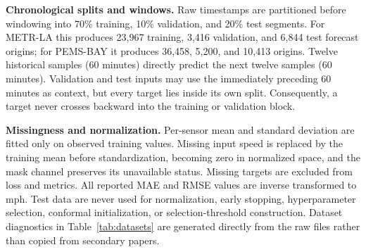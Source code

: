 \documentclass[preprint,12pt]{elsarticle}
\begin{document}
\textbf{Chronological splits and windows.} Raw timestamps are partitioned
before windowing into 70\% training, 10\% validation, and 20\% test segments.
For METR-LA this produces 23,967 training, 3,416 validation, and 6,844 test
forecast origins; for PEMS-BAY it produces 36,458, 5,200, and 10,413 origins.
Twelve historical samples (60 minutes) directly predict the next twelve
samples (60 minutes). Validation and test inputs may use the immediately
preceding 60 minutes as context, but every target lies inside its own split.
Consequently, a target never crosses backward into the training or validation
block.

\textbf{Missingness and normalization.} Per-sensor mean and standard deviation
are fitted only on observed training values. Missing input speed is replaced by
the training mean before standardization, becoming zero in normalized space,
and the mask channel preserves its unavailable status. Missing targets are
excluded from loss and metrics. All reported MAE and RMSE values are inverse
transformed to mph. Test data are never used for normalization, early stopping,
hyperparameter selection, conformal initialization, or selection-threshold
construction. Dataset diagnostics in Table~\ref{tab:datasets} are generated
directly from the raw files rather than copied from secondary papers.
\begin{table}[t]
  \centering
  \caption{Dataset diagnostics computed from checksum-verified raw files.
  Speed is in miles per hour; correlations use observed values at 5-minute and
  one-day lags.}
  \label{tab:datasets}
  \resizebox{\textwidth}{!}{}
\end{table}
\end{document}
